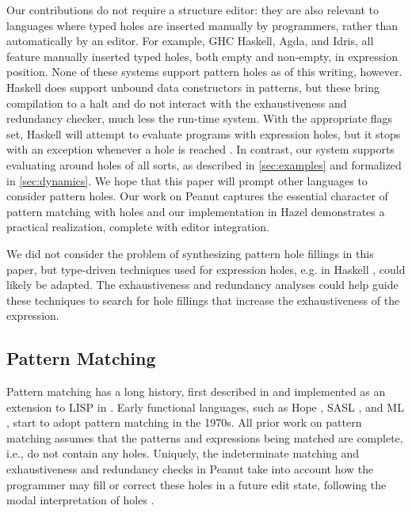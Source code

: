 Our contributions do not require a structure editor: they are also relevant to languages where typed holes are inserted 
manually by programmers, rather than automatically by an editor. 
For example, GHC Haskell, Agda, and Idris, all feature manually inserted typed holes, both empty and non-empty, in expression position. 
None of these systems support pattern holes as of this writing, however. Haskell does support unbound data constructors in patterns, but these bring compilation to a halt and do not interact with the exhaustiveness and redundancy checker, much less the run-time system. With the appropriate flags set, Haskell will attempt to evaluate programs with expression holes, but it stops with an exception whenever a hole is reached \cite{GHCHoles}. In contrast, our system supports evaluating around holes of all sorts, as described in \autoref{sec:examples} and formalized in \autoref{sec:dynamics}. We hope that this paper will prompt other languages to 
consider pattern holes. Our work on Peanut captures the essential character of pattern matching with holes and our implementation in Hazel 
demonstrates a practical realization, complete with editor integration.

We did not consider the problem of synthesizing pattern hole fillings in this paper, but type-driven techniques used for expression holes, e.g. in Haskell \cite{DBLP:conf/haskell/Gissurarson18}, could likely be adapted. The exhaustiveness and redundancy analyses could help guide these techniques to search for hole fillings that increase the exhaustiveness of the  expression.

\subsection{Pattern Matching}
Pattern matching has a long history, first described in \cite{DBLP:journals/cj/Burstall69} and implemented as an extension to LISP in \cite{DBLP:phd/ethos/McBride70}. Early functional languages,
such as Hope \cite{DBLP:conf/lfp/BurstallMS80}, SASL \cite{DBLP:journals/spe/Turner79}, and ML \cite{DBLP:journals/jcss/Milner78}, start to adopt pattern matching in the 1970s.
All prior work on pattern matching assumes that the patterns and expressions being matched are
complete, i.e., do not contain any holes.
Uniquely, the indeterminate matching and exhaustiveness and redundancy checks in Peanut
take into account how the programmer may fill or correct these holes in a future edit state,
following the modal interpretation of holes \cite{DBLP:journals/tocl/NanevskiPP08,DBLP:journals/pacmpl/OmarVCH19}.

